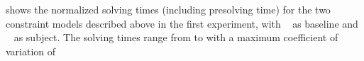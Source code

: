 \renewcommand{\thefigure}{\oldthefigure}

 shows the normalized
solving times (including \gls{presolving} time) for the two \glspl{constraint
  model} described above in the first experiment, with ~\modelA{} as \gls{baseline} and ~\modelB{}
as \gls{subject}.
%
The solving times range from
\printMinSolvingTime{
  \SolvTechDisableImplConsDefsDominateDefsPrePlusSolvingTimeSpeedupAllPrePlusSolvingTimeAvgMin,
  \SolvTechDisableImplConsDefsDominateDefsPrePlusSolvingTimeSpeedupPrePlusSolvingTimeAvgMin,
  \SolvTechDisableImplConsDefsInSpannedBlocksPrePlusSolvingTimeSpeedupPrePlusSolvingTimeAvgMin,
  \SolvTechDisableImplConsIdenticalEntryBlocksPrePlusSolvingTimeSpeedupPrePlusSolvingTimeAvgMin,
  \SolvTechDisableImplConsDefsDominateEntryBlocksPrePlusSolvingTimeSpeedupPrePlusSolvingTimeAvgMin,
  \SolvTechDisableImplConsPlacePhiOpsSameAsDefEdgesPrePlusSolvingTimeSpeedupPrePlusSolvingTimeAvgMin,
  \SolvTechDisableImplConsNoSpanUsesPrePlusSolvingTimeSpeedupPrePlusSolvingTimeAvgMin,
  \SolvTechDisableImplConsNoSpanDefsPrePlusSolvingTimeSpeedupPrePlusSolvingTimeAvgMin,
  \SolvTechDisableImplConsNoSpanUseDefsPrePlusSolvingTimeSpeedupPrePlusSolvingTimeAvgMin,
  \SolvTechDisableImplConsSpannedInputPrePlusSolvingTimeSpeedupPrePlusSolvingTimeAvgMin,
  \SolvTechDisableImplConsUsedDataMustBeAvailablePrePlusSolvingTimeSpeedupPrePlusSolvingTimeAvgMin,
  \SolvTechDisableImplConsExteriorDataMustBeAvailablePrePlusSolvingTimeSpeedupPrePlusSolvingTimeAvgMin,
  \SolvTechDisableImplConsLocsOfUsesPrePlusSolvingTimeSpeedupPrePlusSolvingTimeAvgMin,
  \SolvTechDisableImplConsLocsOfDefsPrePlusSolvingTimeSpeedupPrePlusSolvingTimeAvgMin,
  \SolvTechDisableImplConsFixFallThroughsPrePlusSolvingTimeSpeedupPrePlusSolvingTimeAvgMin
} to
\printMaxSolvingTime{
  \SolvTechDisableImplConsDefsDominateDefsPrePlusSolvingTimeSpeedupAllPrePlusSolvingTimeAvgMax,
  \SolvTechDisableImplConsDefsDominateDefsPrePlusSolvingTimeSpeedupPrePlusSolvingTimeAvgMax,
  \SolvTechDisableImplConsDefsInSpannedBlocksPrePlusSolvingTimeSpeedupPrePlusSolvingTimeAvgMax,
  \SolvTechDisableImplConsIdenticalEntryBlocksPrePlusSolvingTimeSpeedupPrePlusSolvingTimeAvgMax,
  \SolvTechDisableImplConsDefsDominateEntryBlocksPrePlusSolvingTimeSpeedupPrePlusSolvingTimeAvgMax,
  \SolvTechDisableImplConsPlacePhiOpsSameAsDefEdgesPrePlusSolvingTimeSpeedupPrePlusSolvingTimeAvgMax,
  \SolvTechDisableImplConsNoSpanUsesPrePlusSolvingTimeSpeedupPrePlusSolvingTimeAvgMax,
  \SolvTechDisableImplConsNoSpanDefsPrePlusSolvingTimeSpeedupPrePlusSolvingTimeAvgMax,
  \SolvTechDisableImplConsNoSpanUseDefsPrePlusSolvingTimeSpeedupPrePlusSolvingTimeAvgMax,
  \SolvTechDisableImplConsSpannedInputPrePlusSolvingTimeSpeedupPrePlusSolvingTimeAvgMax,
  \SolvTechDisableImplConsUsedDataMustBeAvailablePrePlusSolvingTimeSpeedupPrePlusSolvingTimeAvgMax,
  \SolvTechDisableImplConsExteriorDataMustBeAvailablePrePlusSolvingTimeSpeedupPrePlusSolvingTimeAvgMax,
  \SolvTechDisableImplConsLocsOfUsesPrePlusSolvingTimeSpeedupPrePlusSolvingTimeAvgMax,
  \SolvTechDisableImplConsLocsOfDefsPrePlusSolvingTimeSpeedupPrePlusSolvingTimeAvgMax,
  \SolvTechDisableImplConsFixFallThroughsPrePlusSolvingTimeSpeedupPrePlusSolvingTimeAvgMax
} with a maximum coefficient of variation of

